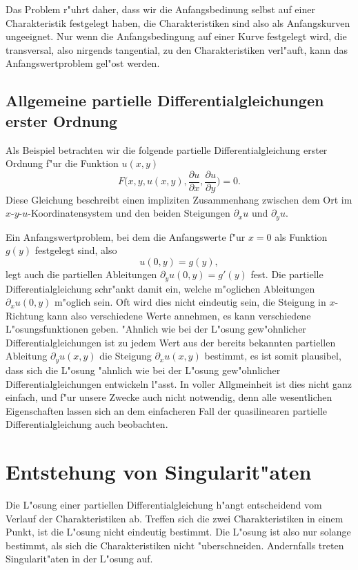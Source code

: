 Das Problem r"uhrt daher, dass wir die Anfangsbedinung selbst auf einer
Charakteristik festgelegt haben, die Charakteristiken sind also als
Anfangskurven ungeeignet. Nur wenn die Anfangsbedingung auf einer Kurve
festgelegt wird, die transversal, also nirgends tangential, zu den
Charakteristiken verl"auft, kann das Anfangswertproblem gel"ost werden.

\subsection{Allgemeine partielle Differentialgleichungen erster Ordnung}
Als Beispiel betrachten wir die folgende partielle Differentialgleichung
erster Ordnung f"ur die Funktion $u(x,y)$
\begin{equation}
F\biggl(
x,y,u(x,y),\frac{\partial u}{\partial x},\frac{\partial u}{\partial y}
\biggr)=0.
\end{equation}
Diese Gleichung beschreibt einen impliziten Zusammenhang zwischen
dem Ort im $x$-$y$-$u$-Koordinatensystem und den beiden Steigungen
$\partial_xu$ und $\partial_yu$.

Ein Anfangswertproblem, bei dem die Anfangswerte f"ur $x=0$ als
Funktion $g(y)$ festgelegt sind, also
\[
u(0,y)=g(y),
\]
legt auch die
partiellen Ableitungen $\partial_y u(0,y)=g'(y)$ fest.  Die partielle
Differentialgleichung schr"ankt damit ein, welche m"oglichen Ableitungen
$\partial_xu(0,y)$ m"oglich sein. Oft wird dies nicht eindeutig sein,
die Steigung in $x$-Richtung kann also verschiedene Werte annehmen,
es kann verschiedene L"osungsfunktionen geben. "Ahnlich wie bei der
L"osung gew"ohnlicher Differentialgleichungen ist zu jedem Wert
aus der bereits bekannten partiellen Ableitung $\partial_yu(x,y)$
die Steigung $\partial_xu(x,y)$ bestimmt, es ist somit plausibel, dass
sich die L"osung "ahnlich wie bei der L"osung gew"ohnlicher Differentialgleichungen
entwickeln l"asst. In voller Allgmeinheit ist dies nicht ganz einfach,
und f"ur unsere Zwecke auch nicht notwendig, denn alle wesentlichen
Eigenschaften lassen sich an dem einfacheren Fall der quasilinearen
partielle Differentialgleichung auch beobachten.


\section{Entstehung von Singularit"aten}
Die L"osung einer partiellen Differentialgleichung h"angt entscheidend
vom Verlauf der Charakteristiken ab. Treffen sich die zwei Charakteristiken
in einem Punkt, ist die L"osung nicht eindeutig bestimmt. Die L"osung
ist also nur solange bestimmt, als sich die Charakteristiken nicht "uberschneiden.
Andernfalls treten Singularit"aten in der L"osung auf.

